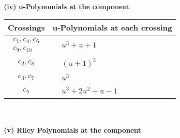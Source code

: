 \documentclass[1p]{elsarticle_modified}
\theoremstyle{definition}
\begin{document}
\newpage\renewcommand{\arraystretch}{1}
\flushleft \textbf{(iv) u-Polynomials at the component}\newline \\
\begin{tabular}{m{50pt}|m{274pt}}
Crossings & \hspace{64pt}u-Polynomials at each crossing \\
\hline $$\begin{aligned}c_{1},c_{4},c_{6}\\c_{9},c_{10}\end{aligned}$$&$\begin{aligned}
&u^3+u+1
\end{aligned}$\\
\hline $$\begin{aligned}c_{2},c_{8}\end{aligned}$$&$\begin{aligned}
&(u+1)^3
\end{aligned}$\\
\hline $$\begin{aligned}c_{3},c_{7}\end{aligned}$$&$\begin{aligned}
&u^3
\end{aligned}$\\
\hline $$\begin{aligned}c_{5}\end{aligned}$$&$\begin{aligned}
&u^3+2 u^2+u-1
\end{aligned}$\\
\hline
\end{tabular}\\~\\
\newpage\renewcommand{\arraystretch}{1}
\flushleft \textbf{(v) Riley Polynomials at the component}\newline \\
\end{document}
